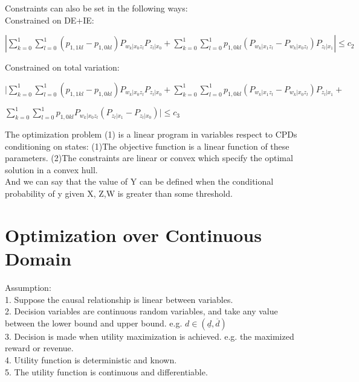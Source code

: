 \documentclass{article} %
\begin{document}
\hspace*{1em}Constraints can also be set in the following ways:\\
\hspace*{1em}Constrained on DE+IE: \\
\centerline{$|\sum_{k=0}^{1}\sum_{l=0}^{1} (p_{1, 1kl}- p_{1, 0kl}) P_{w_k|x_0z_l}P_{z_l|x_0} + \sum_{k=0}^{1}\sum_{l=0}^{1} p_{1, 0kl}(P_{w_k|x_1z_l}- P_{w_k|x_0z_l})P_{z_l|x_1}| \leq c_2$}
Constrained on total variation: \\
\centerline{$|\sum_{k=0}^{1}\sum_{l=0}^{1} (p_{1, 1kl}- p_{1, 0kl}) P_{w_k|x_0z_l}P_{z_l|x_0} + \sum_{k=0}^{1}\sum_{l=0}^{1} p_{1, 0kl}(P_{w_k|x_1z_l}- P_{w_k|x_0z_l})P_{z_l|x_1} + $}
\centerline{$\sum_{k=0}^{1}\sum_{l=0}^{1} p_{1, 0kl}P_{w_k|x_0z_l}(P_{z_l|x_1}-P_{z_l|x_0})| \leq c_3$}
\hspace*{1em}The optimization problem (1) is a linear program in variables respect to CPDs conditioning on states:  (1)The objective function is a linear function of these parameters. (2)The constraints are linear or convex which specify the optimal solution in a convex hull.\\
\hspace*{1em}And we can say that the value of Y can be defined when the conditional probability of y given X, Z,W is greater than some threshold.\\

\section{Optimization over Continuous Domain}
\hspace*{1em}Assumption:\\
\hspace*{1em}1. Suppose the causal relationship is linear between variables.\\
\hspace*{1em}2. Decision variables are continuous random variables, and take any value between the lower bound and upper bound. e.g. $d\in (\underline{d}, \overline{d})$\\
\hspace*{1em}3. Decision is made when utility maximization is achieved. e.g. the maximized reward or revenue.\\
\hspace*{1em}4. Utility function is deterministic and known.\\
\hspace*{1em}5. The utility function is continuous and differentiable.\\
\end{document}
